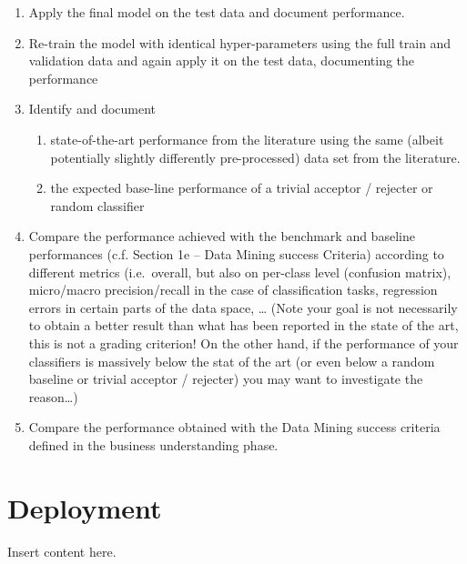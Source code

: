\documentclass[sigchi]{acmart}
\def\tightlist{}
\begin{document}
\begin{enumerate}
\def\labelenumi{\alph{enumi}.}
\tightlist
\item
  Apply the final model on the test data and document performance.
\item
  Re-train the model with identical hyper-parameters using the full train and validation data and again apply it on the test data, documenting the performance
\item
  Identify and document

  \begin{enumerate}
  \def\labelenumii{\roman{enumii}.}
  \tightlist
  \item
    state-of-the-art performance from the literature using the same (albeit potentially slightly differently pre-processed) data set from the literature.
  \item
    the expected base-line performance of a trivial acceptor / rejecter or random classifier
  \end{enumerate}
\item
  Compare the performance achieved with the benchmark and baseline performances (c.f. Section 1e -- Data Mining success Criteria) according to different metrics (i.e.~overall, but also on per-class level (confusion matrix), micro/macro precision/recall in the case of classification tasks, regression errors in certain parts of the data space, \ldots{} (Note your goal is not necessarily to obtain a better result than what has been reported in the state of the art, this is not a grading criterion! On the other hand, if the performance of your classifiers is massively below the stat of the art (or even below a random baseline or trivial acceptor / rejecter) you may want to investigate the reason\ldots)
\item
  Compare the performance obtained with the Data Mining success criteria defined in the business understanding phase.
\end{enumerate}

\hypertarget{deployment}{%
\section{Deployment}\label{deployment}}

Insert content here.
\end{document}
